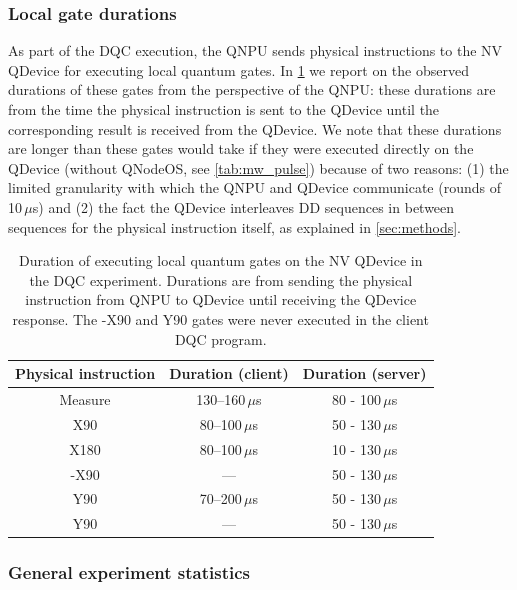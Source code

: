 \subsubsection{Local gate durations}

As part of the \ac{DQC} execution, the \ac{QNPU} sends physical instructions to the \ac{NV} \ac{QDevice} for executing local quantum gates. In \cref{tab:gate_durations} we report on the observed durations of these gates from the perspective of the \ac{QNPU}: these durations are from the time the physical instruction is sent to the \ac{QDevice} until the corresponding result is received from the \ac{QDevice}. We note that these durations are longer than these gates would take if they were executed directly on the \ac{QDevice} (without \ac{QNodeOS}, see \cref{tab:mw_pulse}) because of two reasons: (1) the limited granularity with which the \ac{QNPU} and \ac{QDevice} communicate (rounds of 10\,$\mu$s) and (2) the fact the \ac{QDevice} interleaves \ac{DD} sequences in between sequences for the physical instruction itself, as explained in \cref{sec:methods}.

\begin{table}
    \centering
    \begin{tabular}{|c|c|c|}
    \hline
    \textbf{Physical instruction} & \textbf{Duration (client)} & \textbf{Duration (server)} \\ 
    \hline
    Measure & 130--160\,$\mu$s & 80 - 100\,$\mu$s \\
    X90 & 80--100\,$\mu$s & 50 - 130\,$\mu$s \\
    X180 & 80--100\,$\mu$s & 10 - 130\,$\mu$s \\
    -X90 & --- & 50 - 130\,$\mu$s \\
    Y90 & 70--200\,$\mu$s & 50 - 130\,$\mu$s \\
    Y90 & --- & 50 - 130\,$\mu$s \\
    \hline
    \end{tabular}
    \caption{Duration of executing local quantum gates on the \ac{NV} \ac{QDevice} in the \ac{DQC} experiment. Durations are from sending the physical instruction from \ac{QNPU} to \ac{QDevice} until receiving the \ac{QDevice} response. The -X90 and Y90 gates were never executed in the client \ac{DQC} program.}
    \label{tab:gate_durations}
\end{table}

\subsubsection{General experiment statistics}

